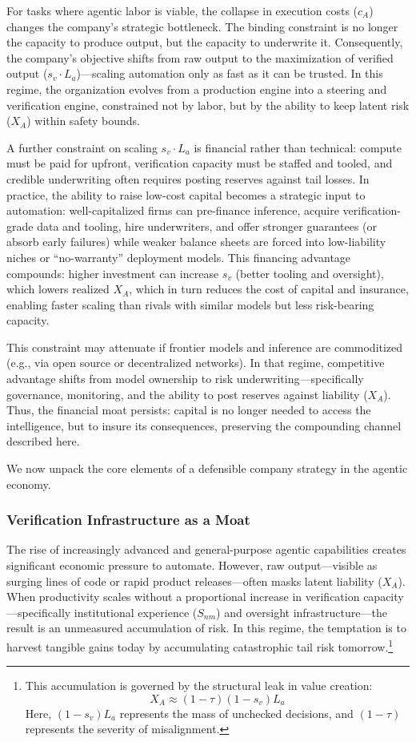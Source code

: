 \documentclass[12pt, letter]{article}
\begin{document}
For tasks where agentic labor is viable, the collapse in execution costs ($c_A$) changes the company's strategic bottleneck. The binding constraint is no longer the capacity to produce output, but the capacity to underwrite it. Consequently, the company's objective shifts from raw output to the maximization of verified output ($s_v \cdot L_a$)—scaling automation only as fast as it can be trusted. In this regime, the organization evolves from a production engine into a steering and verification engine, constrained not by labor, but by the ability to keep latent risk ($X_A$) within safety bounds. 

A further constraint on scaling $s_v\cdot L_a$ is financial rather than technical: compute must be paid for upfront, verification capacity must be staffed and tooled, and credible underwriting often requires posting reserves against tail losses. In practice, the ability to raise low-cost capital becomes a strategic input to automation: well-capitalized firms can pre-finance inference, acquire verification-grade data and tooling, hire underwriters, and offer stronger guarantees (or absorb early failures) while weaker balance sheets are forced into low-liability niches or ``no-warranty'' deployment models. This financing advantage compounds: higher investment can increase $s_v$ (better tooling and oversight), which lowers realized $X_A$, which in turn reduces the cost of capital and insurance, enabling faster scaling than rivals with similar models but less risk-bearing capacity.

This constraint may attenuate if frontier models and inference are commoditized (e.g., via open source or decentralized networks). In that regime, competitive advantage shifts from model ownership to risk underwriting—specifically governance, monitoring, and the ability to post reserves against liability ($X_A$). Thus, the financial moat persists: capital is no longer needed to access the intelligence, but to insure its consequences, preserving the compounding channel described here.

We now unpack the core elements of a defensible company strategy in the agentic economy.

\subsubsection{Verification Infrastructure as a Moat}

The rise of increasingly advanced and general-purpose agentic capabilities creates significant economic pressure to automate. However, raw output—visible as surging lines of code or rapid product releases—often masks latent liability ($X_A$). When productivity scales without a proportional increase in verification capacity—specifically institutional experience ($S_{nm}$) and oversight infrastructure—the result is an unmeasured accumulation of risk. In this regime, the temptation is to harvest tangible gains today by accumulating catastrophic tail risk tomorrow.\footnote{This accumulation is governed by the structural leak in value creation:
$$X_A \approx (1-\tau)(1-s_v)L_a$$
Here, $(1-s_v)L_a$ represents the mass of unchecked decisions, and $(1-\tau)$ represents the severity of misalignment.}  
\end{document}
